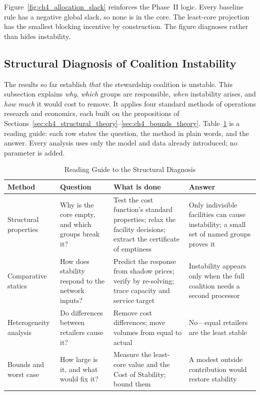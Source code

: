 Figure~\ref{fig:ch4_allocation_slack} reinforces the Phase~II logic. Every baseline rule has a negative global slack, so none is in the core. The least-core projection has the smallest blocking incentive by construction. The figure diagnoses rather than hides instability.

\subsection{Structural Diagnosis of Coalition Instability}
\label{sec:ch4_structural_diagnosis}

The results so far establish \emph{that} the stewardship coalition is unstable. This subsection explains \emph{why}, \emph{which} groups are responsible, \emph{when} instability arises, and \emph{how much} it would cost to remove. It applies four standard methods of operations research and economics, each built on the propositions of Sections~\ref{sec:ch4_structural_theory}--\ref{sec:ch4_bounds_theory}. Table~\ref{tab:ch4_diagnosis_roadmap} is a reading guide: each row states the question, the method in plain words, and the answer. Every analysis uses only the model and data already introduced; no parameter is added.

\begin{table}[htbp]
\centering
\caption{Reading Guide to the Structural Diagnosis}
\label{tab:ch4_diagnosis_roadmap}
\small
\begin{tabular}{p{}p{}p{}p{}}
\toprule
\textbf{Method} & \textbf{Question} & \textbf{What is done} & \textbf{Answer} \\
\midrule
Structural properties & Why is the core empty, and which groups break it? & Test the cost function's standard properties; relax the facility decisions; extract the certificate of emptiness & Only indivisible facilities can cause instability; a small set of named groups proves it \\
Comparative statics & How does stability respond to the network inputs? & Predict the response from shadow prices; verify by re-solving; trace capacity and service target & Instability appears only when the full coalition needs a second processor \\
Heterogeneity analysis & Do differences between retailers cause it? & Remove cost differences; move volumes from equal to actual & No---equal retailers are the least stable \\
Bounds and worst case & How large is it, and what would fix it? & Measure the least-core value and the Cost of Stability; bound them & A modest outside contribution would restore stability \\
\bottomrule
\end{tabular}
\end{table}

